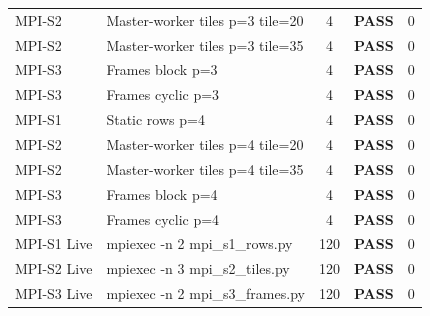 \begin{table}[htbp]
\begin{tabular}{llccc}
MPI-S2 & Master-worker tiles p=3 tile=20 & 4 & \textbf{PASS} & 0 \\
MPI-S2 & Master-worker tiles p=3 tile=35 & 4 & \textbf{PASS} & 0 \\
MPI-S3 & Frames block p=3 & 4 & \textbf{PASS} & 0 \\
MPI-S3 & Frames cyclic p=3 & 4 & \textbf{PASS} & 0 \\
MPI-S1 & Static rows p=4 & 4 & \textbf{PASS} & 0 \\
MPI-S2 & Master-worker tiles p=4 tile=20 & 4 & \textbf{PASS} & 0 \\
MPI-S2 & Master-worker tiles p=4 tile=35 & 4 & \textbf{PASS} & 0 \\
MPI-S3 & Frames block p=4 & 4 & \textbf{PASS} & 0 \\
MPI-S3 & Frames cyclic p=4 & 4 & \textbf{PASS} & 0 \\
MPI-S1 Live & mpiexec -n 2 mpi\_s1\_rows.py & 120 & \textbf{PASS} & 0 \\
MPI-S2 Live & mpiexec -n 3 mpi\_s2\_tiles.py & 120 & \textbf{PASS} & 0 \\
MPI-S3 Live & mpiexec -n 2 mpi\_s3\_frames.py & 120 & \textbf{PASS} & 0 \\
\bottomrule
\end{tabular}
\end{table}
